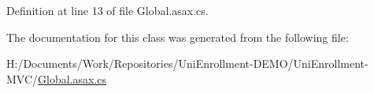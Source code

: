 Definition at line 13 of file Global.\+asax.\+cs.



The documentation for this class was generated from the following file\+:\begin{DoxyCompactItemize}
\item 
H\+:/\+Documents/\+Work/\+Repositories/\+Uni\+Enrollment-\/\+D\+E\+M\+O/\+Uni\+Enrollment-\/\+M\+V\+C/\hyperlink{_global_8asax_8cs}{Global.\+asax.\+cs}\end{DoxyCompactItemize}
